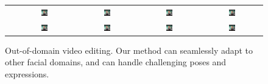 \begin{figure}
{\begin{tabular}{ccccc}
        \raisebox{0.15in}{\rotatebox{90}{Original}} &
        \includegraphics[width=0.11\textwidth]{resources/images/OOD/source_0074.jpeg} &
        \includegraphics[width=0.11\textwidth]{resources/images/OOD/source_0084.jpeg} &
        \includegraphics[width=0.11\textwidth]{resources/images/OOD/source_0113.jpeg} &
        \includegraphics[width=0.11\textwidth]{resources/images/OOD/source_0138.jpeg} \\
        
        \raisebox{0.18in}{\rotatebox{90}{$+Smile$}} &
        \includegraphics[width=0.11\textwidth]{resources/images/OOD/edit_0074.jpeg} &
        \includegraphics[width=0.11\textwidth]{resources/images/OOD/edit_0084.jpeg} &
        \includegraphics[width=0.11\textwidth]{resources/images/OOD/edit_0113.jpeg} &
        \includegraphics[width=0.11\textwidth]{resources/images/OOD/edit_0138.jpeg} \\


        
    \end{tabular}
    
    }
    \vspace{-0.225cm}
    \caption{Out-of-domain video editing. Our method can seamlessly adapt to other facial domains, and can handle challenging poses and expressions.}
    \label{fig:ood}
\end{figure}